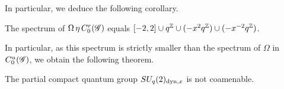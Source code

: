 In particular, we deduce the following corollary.

\begin{Cor} The spectrum of $\Omega \,\eta\, C^{r}_{0}(\mathscr{G})$ equals $\lbrack -2,2\rbrack \cup q^{\mathbb{Z}} \cup (-x^2q^{\mathbb{Z}})\cup (-x^{-2}q^{\mathbb{Z}})$.
\end{Cor} 

In particular, as this spectrum is strictly smaller than the spectrum of $\Omega$ in $C^{u}_{0}(\mathscr{G})$, we obtain the following theorem.

\begin{Theorem} The partial compact quantum group $SU_q(2)_{\operatorname{\mathrm{dyn}},x}$ is not coamenable.
\end{Theorem} 





